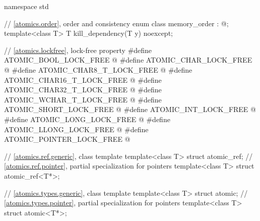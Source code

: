 %
\begin{codeblock}
namespace std {
  // \ref{atomics.order}, order and consistency
  enum class memory_order : @\unspec@;
  template<class T>
    T kill_dependency(T y) noexcept;

  // \ref{atomics.lockfree}, lock-free property
  #define ATOMIC_BOOL_LOCK_FREE @\unspec@
  #define ATOMIC_CHAR_LOCK_FREE @\unspec@
  #define ATOMIC_CHAR8_T_LOCK_FREE @\unspec@
  #define ATOMIC_CHAR16_T_LOCK_FREE @\unspec@
  #define ATOMIC_CHAR32_T_LOCK_FREE @\unspec@
  #define ATOMIC_WCHAR_T_LOCK_FREE @\unspec@
  #define ATOMIC_SHORT_LOCK_FREE @\unspec@
  #define ATOMIC_INT_LOCK_FREE @\unspec@
  #define ATOMIC_LONG_LOCK_FREE @\unspec@
  #define ATOMIC_LLONG_LOCK_FREE @\unspec@
  #define ATOMIC_POINTER_LOCK_FREE @\unspec@

  // \ref{atomics.ref.generic}, class template 
  template<class T> struct atomic_ref;
  // \ref{atomics.ref.pointer}, partial specialization for pointers
  template<class T> struct atomic_ref<T*>;

  // \ref{atomics.types.generic}, class template 
  template<class T> struct atomic;
  // \ref{atomics.types.pointer}, partial specialization for pointers
  template<class T> struct atomic<T*>;

}
\end{codeblock}
